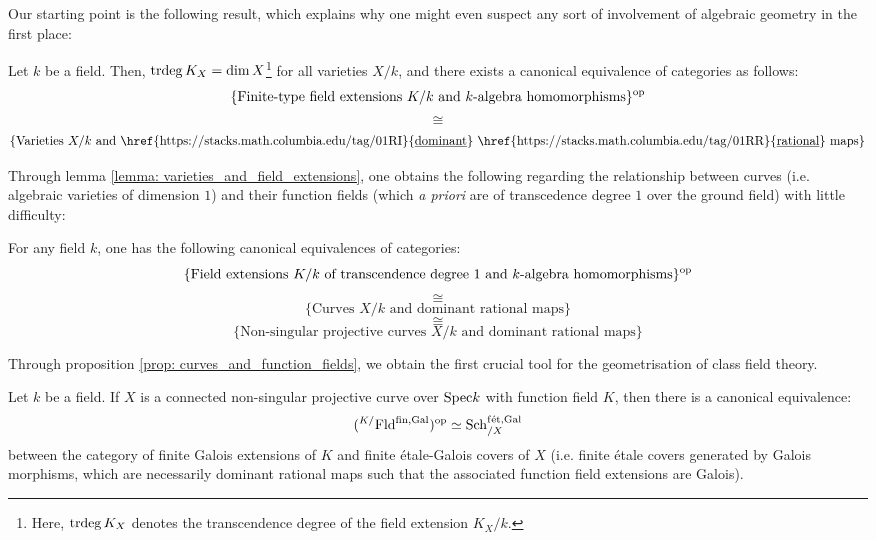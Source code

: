             Our starting point is the following result, which explains why one might even suspect any sort of involvement of algebraic geometry in the first place:
            \begin{lemma} \label{lemma: varieties_and_field_extensions}
                \cite[\href{https://stacks.math.columbia.edu/tag/0BXN}{Tag 0BXN}]{stacks} Let $k$ be a field. Then, $\operatorname{trdeg} K_X = \dim X$\footnote{Here, $\operatorname{trdeg} K_X$ denotes the transcendence degree of the field extension $K_X/k$.} for all varieties $X/k$, and there exists a canonical equivalence of categories as follows:
                    $$\{\text{Finite-type field extensions $K/k$ and $k$-algebra homomorphisms}\}^{\mathrm{op}}$$
                    $$\cong$$
                    $$\{\text{Varieties $X/k$ and \href{https://stacks.math.columbia.edu/tag/01RI}{\underline{dominant}} \href{https://stacks.math.columbia.edu/tag/01RR}{\underline{rational}} maps}\}$$
            \end{lemma}
            Through lemma \ref{lemma: varieties_and_field_extensions}, one obtains the following regarding the relationship between curves (i.e. algebraic varieties of dimension $1$) and their function fields (which \textit{a priori} are of transcedence degree $1$ over the ground field) with little difficulty:
            \begin{proposition} \label{prop: curves_and_function_fields}
                \cite[\href{https://stacks.math.columbia.edu/tag/0BY1}{Tag 0BY1}]{stacks} For any field $k$, one has the following canonical equivalences of categories:
                    $$\{\text{Field extensions $K/k$ of transcendence degree $1$ and $k$-algebra homomorphisms}\}^{\mathrm{op}}$$
                    $$\cong$$
                    $$\{\text{Curves $X/k$ and dominant rational maps}\}$$
                    $$\cong$$
                    $$\{\text{Non-singular projective curves $X/k$ and dominant rational maps}\}$$
            \end{proposition}
            Through proposition \ref{prop: curves_and_function_fields}, we obtain the first crucial tool for the geometrisation of class field theory.
            \begin{corollary} \label{coro: galois_covers_of_curves_and_galois_extensions}
                Let $k$ be a field. If $X$ is a connected non-singular projective curve over $\mathrm{Spec} k$ with function field $K$, then there is a canonical equivalence:
                    $$({}^{K/}\mathrm{Fld}^{\mathrm{fin}, \mathrm{Gal}})^{\mathrm{op}} \simeq \mathrm{Sch}_{/X}^{\mathrm{f\acute{e}t}, \mathrm{Gal}}$$
                between the category of finite Galois extensions of $K$ and finite \'etale-Galois covers of $X$ (i.e. finite \'etale covers generated by Galois morphisms, which are necessarily dominant rational maps such that the associated function field extensions are Galois). 
            \end{corollary}
